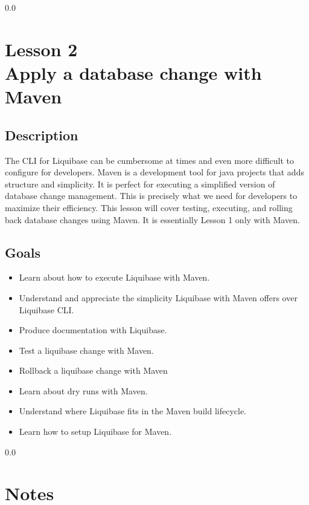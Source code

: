 {\setlength{\baselineskip}%
  {0.0\baselineskip}
  \section*{\flushright Lesson 2\\
  Apply a database change with Maven}
  \hrulefill \par}

\subsection*{Description}
The CLI for Liquibase can be cumbersome at times and even more
difficult to configure for developers. Maven is a development tool for
java projects that adds structure and simplicity. It is perfect for
executing a simplified version of database change management. This is
precisely what we need for developers to maximize their
efficiency. This lesson will cover testing, executing, and rolling back
database changes using Maven. It is essentially Lesson 1 only with Maven.


\subsection*{Goals}
\begin{itemize}
  \item Learn about how to execute Liquibase with Maven.
  \item Understand and appreciate the simplicity Liquibase with Maven
    offers over Liquibase CLI.
  \item Produce documentation with Liquibase.
  \item Test a liquibase change with Maven.
  \item Rollback a liquibase change with Maven
  \item Learn about dry runs with Maven.
  \item Understand where Liquibase fits in the Maven build lifecycle.
  \item Learn how to setup Liquibase for Maven.
\end{itemize}

\newpage
  {\setlength{\baselineskip}%
           {0.0\baselineskip}
  \section*{Notes}
  \hrulefill \par}

